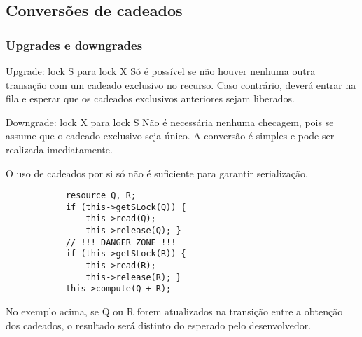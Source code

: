 \documentclass{beamer}
\begin{document}

\subsection{Conversões de cadeados} %

\begin{frame}

    \frametitle{Upgrades e downgrades}
    \begin{block}{Upgrade: lock S para lock X}
        Só é possível se não houver nenhuma outra transação com um cadeado exclusivo no recurso. Caso contrário, deverá entrar na fila e esperar que os cadeados exclusivos anteriores sejam liberados.
    \end{block}
    \begin{block}{Downgrade: lock X para lock S}
        Não é necessária nenhuma checagem, pois se assume que o cadeado exclusivo seja único. A conversão é simples e pode ser realizada imediatamente.
    \end{block}

\end{frame}


\begin{frame}[fragile]
    O uso de cadeados por si só não é suficiente para garantir serialização.

    \begin{example}
        \begin{verbatim}
            resource Q, R;
            if (this->getSLock(Q)) {
                this->read(Q);
                this->release(Q); }
            // !!! DANGER ZONE !!!
            if (this->getSLock(R)) {
                this->read(R);
                this->release(R); }
            this->compute(Q + R);
        \end{verbatim}
    \end{example}

    No exemplo acima, se Q ou R forem atualizados na transição entre a obtenção dos cadeados, o resultado será distinto do esperado pelo desenvolvedor.

\end{frame}

\end{document}
